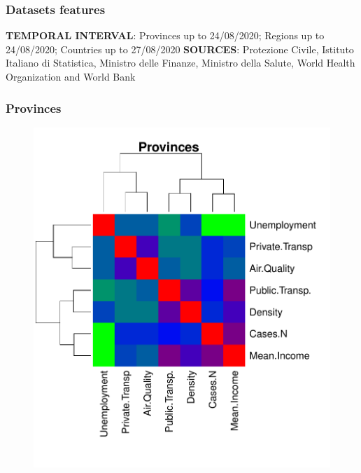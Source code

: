 \documentclass[compress]{beamer}
\begin{document}
\begin{frame}
\frametitle{Datasets features }

\textbf{TEMPORAL INTERVAL}: Provinces up to 24/08/2020; Regions up to 24/08/2020; Countries up to 27/08/2020 
\newline
\newline
\textbf{SOURCES}: Protezione Civile, Istituto Italiano di Statistica, Ministro delle Finanze, Ministro della Salute, World Health Organization and World Bank 

\end{frame}

\begin{frame}
\frametitle{Provinces}

\begin{figure}[H]
\centering
\begin{minipage}{.6\textwidth}
  \centering
  \includegraphics[width=\linewidth, ]{Pic/Province_FULL_CorrMatrix.pdf}
\end{minipage}%
\begin{minipage}{.3\textwidth}
  \centering

\end{minipage}
\end{figure}
\end{frame}
\end{document}
